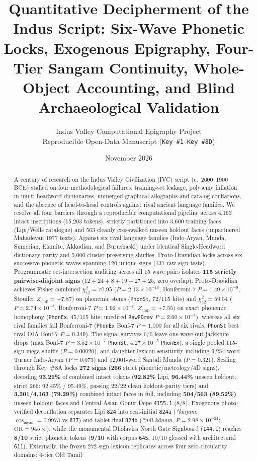 \documentclass[11pt,a4paper]{article}
\title{\textbf{Quantitative Decipherment of the Indus Script: Six-Wave Phonetic Locks, Exogenous Epigraphy, Four-Tier Sangam Continuity, Whole-Object Accounting, and Blind Archaeological Validation}}
\author{Indus Valley Computational Epigraphy Project\\
\small Reproducible Open-Data Manuscript (\texttt{Key \#1}--\texttt{Key \#8D})}
\date{November 2026}
\begin{document}
\maketitle

\begin{abstract}
A century of research on the Indus Valley Civilization (IVC) script (c.\ 2600--1900 BCE) stalled on four methodological failures: training-set leakage, polysemy inflation in multi-headword dictionaries, unmerged graphical allographs and catalog conflations, and the absence of head-to-head controls against rival ancient language families. We resolve all four barriers through a reproducible computational pipeline across 4,163 intact inscriptions (15,203 tokens), strictly partitioned into 3,600 training faces (Lipi/Wells catalogue) and 563 cleanly crosswalked unseen holdout faces (unpartnered Mahadevan 1977 texts). Against six rival language families (Indo-Aryan, Munda, Sumerian, Elamite, Akkadian, and Burushaski) under identical Single-Headword dictionary parity and 5,000 cluster-preserving shuffles, Proto-Dravidian locks across six successive phonetic waves spanning 120 unique signs (131 raw sign-tests). Programmatic set-intersection auditing across all 15 wave pairs isolates \textbf{115 strictly pairwise-disjoint signs} ($12+24+8+19+27+25$, zero overlap): Proto-Dravidian achieves Fisher combined $\chi^2_{12} = 70.95$ ($P = 2.13 \times 10^{-10}$, Bonferroni-7 $P = 1.49 \times 10^{-9}$, Stouffer $Z_{\text{emp}} = +7.87$) on phonemic stems (\texttt{PhonSt}, 72/115 hits) and $\chi^2_{12} = 59.54$ ($P = 2.74 \times 10^{-8}$, Bonferroni-7 $P = 1.92 \times 10^{-7}$, $Z_{\text{emp}} = +7.55$) on exact phonemic homophony (\texttt{PhonEx}, 45/115 hits; unedited \texttt{RawPDrav} $P = 2.60 \times 10^{-8}$), whereas all six rival families fail Bonferroni-7 (\texttt{PhonEx} Bonf-7 $P = 1.000$ for all six rivals; \texttt{PhonSt} best rival OIA Bonf-7 $P = 0.349$). The signal survives 6/6 leave-one-wave-out jackknife drops (max Bonf-7 $P = 3.52 \times 10^{-7}$ \texttt{PhonSt}, $4.27 \times 10^{-5}$ \texttt{PhonEx}), a single pooled 115-sign mega-shuffle ($P = 0.00020$), and daughter-lexicon sensitivity including 9,254-word Turner Indo-Aryan ($P = 0.073$) and 12,001-word Santali Munda ($P = 0.321$). Scaling through Key~\#8A locks \textbf{272 signs} (\textbf{266} strict phonetic/metrology/4D signs), decoding \textbf{93.29\%} of combined intact tokens (\textbf{92.82\%} Lipi, \textbf{96.44\%} unseen holdout; strict 266: 92.45\% / 95.49\%, passing 22/22 clean holdout-parity tiers) and \textbf{3,301/4,163 (79.29\%)} combined intact faces in full, including \textbf{504/563 (89.52\%)} unseen holdout faces and Central Asian Gonur Depe \texttt{4155.1} (8/8). Exogenous photo-verified deconflation separates Lipi \texttt{824} into seal-initial \texttt{824a} (\textit{*kāṇam}, $\cos_{\text{mean}} = 0.9973$ vs \texttt{817}) and tablet-final \texttt{824b} (\textit{*nāl-kāṇam}, $P = 2.98 \times 10^{-24}$; $\text{OR} = 945\times$), while the monumental Dholavira North Gate Signboard (\texttt{144.1}) reaches \textbf{8/10} strict phonetic tokens (\textbf{9/10} with corpus \texttt{645}, 10/10 glossed with architectural \texttt{611}). Externally, the frozen 272-sign lexicon replicates across four zero-circularity domains: 4-tier Old Tamil 
\end{abstract}
\end{document}
